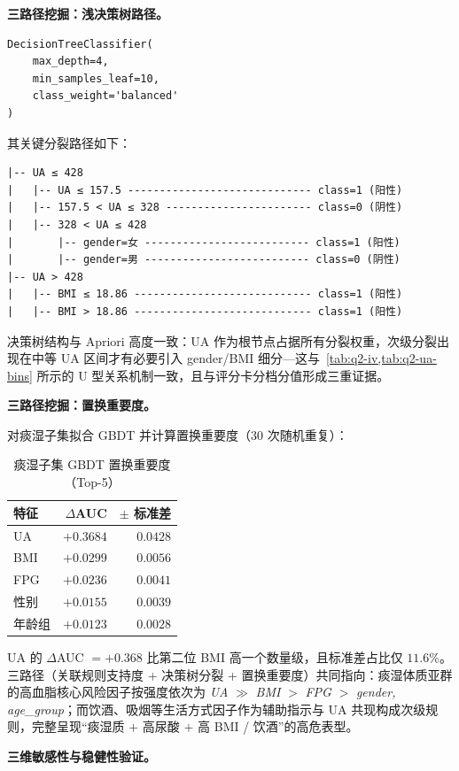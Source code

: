 \documentclass{MathorCupmodeling}
\begin{document}
\noindent\textbf{三路径挖掘：浅决策树路径。}

\begin{lstlisting}
DecisionTreeClassifier(
    max_depth=4,
    min_samples_leaf=10,
    class_weight='balanced'
)
\end{lstlisting}
其关键分裂路径如下：
\begin{verbatim}
|-- UA ≤ 428
|   |-- UA ≤ 157.5 ----------------------------- class=1 (阳性)
|   |-- 157.5 < UA ≤ 328 ----------------------- class=0 (阴性)
|   |-- 328 < UA ≤ 428
|       |-- gender=女 -------------------------- class=1 (阳性)
|       |-- gender=男 -------------------------- class=0 (阴性)
|-- UA > 428
|   |-- BMI ≤ 18.86 ---------------------------- class=1 (阳性)
|   |-- BMI > 18.86 ---------------------------- class=1 (阳性)
\end{verbatim}

决策树结构与 Apriori 高度一致：UA 作为根节点占据所有分裂权重，次级分裂出现在中等 UA 区间才有必要引入 gender/BMI 细分---这与~\cref{tab:q2-iv,tab:q2-ua-bins} 所示的 U 型关系机制一致，且与评分卡分档分值形成三重证据。

\noindent\textbf{三路径挖掘：置换重要度。}

对痰湿子集拟合 GBDT 并计算置换重要度（$30$ 次随机重复）：

\begin{table}[H]
\centering\small
\caption{痰湿子集 GBDT 置换重要度（Top-5）}\label{tab:q2-perm-phlegm}
\begin{tabular}{@{}l r r@{}}
\toprule
特征 & $\Delta$AUC & $\pm$ 标准差 \\
\midrule
UA & $+0.3684$ & $0.0428$ \\
BMI & $+0.0299$ & $0.0056$ \\
FPG & $+0.0236$ & $0.0041$ \\
性别 & $+0.0155$ & $0.0039$ \\
年龄组 & $+0.0123$ & $0.0028$ \\
\bottomrule
\end{tabular}
\end{table}

UA 的 $\Delta$AUC $=+0.368$ 比第二位 BMI 高一个数量级，且标准差占比仅 $11.6\%$。三路径（关联规则支持度 + 决策树分裂 + 置换重要度）共同指向：痰湿体质亚群的高血脂核心风险因子按强度依次为 \textit{UA} $\gg$ \textit{BMI} $>$ \textit{FPG} $>$ \textit{gender, age\_group}；而饮酒、吸烟等生活方式因子作为辅助指示与 UA 共现构成次级规则，完整呈现``痰湿质 $+$ 高尿酸 $+$ 高 BMI / 饮酒''的高危表型。

\noindent\textbf{三维敏感性与稳健性验证。}
\end{document}
